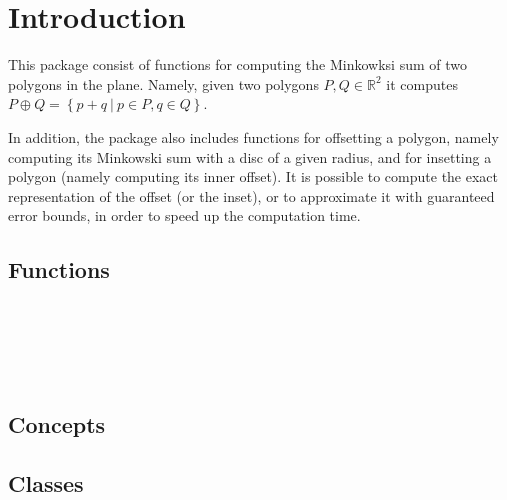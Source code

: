 \clearpage
{}

\section*{Introduction}
\label{mink_ref_sec:intro}

This package consist of functions for computing the Minkowksi sum
of two polygons in the plane. Namely, given two polygons $P,Q \in
\mathbb{R}^2$ it computes $P \oplus Q = \left\{ p + q ~|~ p \in P,
q \in Q \right\}$.

In addition, the package also includes functions for offsetting a
polygon, namely computing its Minkowski sum with a disc of a given
radius, and for insetting a polygon (namely computing its inner
offset). It is possible to compute the exact representation of the
offset (or the inset), or to approximate it with guaranteed error
bounds, in order to speed up the computation time.

\subsection*{Functions}

\\
\\
\\
\\

\subsection*{Concepts}


\subsection*{Classes}

\\
\\
\\
\\

